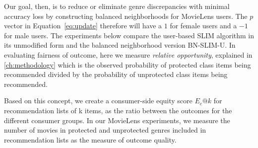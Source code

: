 

Our goal, then, is to reduce or eliminate genre discrepancies with minimal accuracy loss by constructing balanced neighborhoods for MovieLens users. The $p$ vector in Equation~\ref{eq:update} therefore will have a $1$ for female users and a $-1$ for male users. The experiments below compare the user-based SLIM algorithm in its unmodified form and the balanced neighborhood version BN-SLIM-U. In evaluating fairness of outcome, here we measure \textit{relative opportunity}, explained in \ref{ch:methodology} which is the observed probability of protected class items being recommended divided by the probability of unprotected class items being recommended.

Based on this concept, we create a consumer-side equity score $E_c@k$ for recommendation lists of k items, as the ratio between the outcomes for the different consumer groups. In our MovieLens experiments, we measure the number of movies in protected and unprotected genres included in recommendation lists as the measure of outcome quality. 


